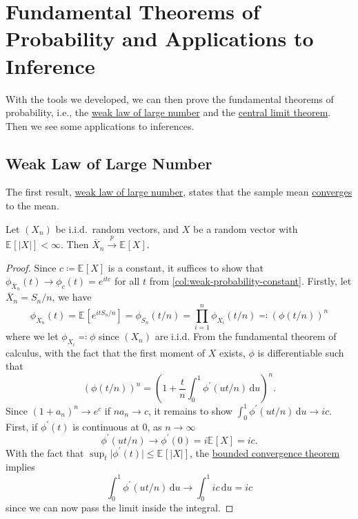 \chapter{Fundamental Theorems of Probability and Applications to Inference}
With the tools we developed, we can then prove the fundamental theorems of probability, i.e., the \hyperref[thm:WLLN]{weak law of large number} and the \hyperref[thm:CLT]{central limit theorem}. Then we see some applications to inferences.
\section{Weak Law of Large Number}
The first result, \hyperref[thm:WLLN]{weak law of large number}, states that the sample mean \hyperref[def:converge-in-probability]{converges} to the mean.

\begin{theorem}\label{thm:WLLN}
	Let \((X_n)\) be i.i.d.\ random vectors, and \(X\) be a random vector with \(\mathbb{E}_{}[\vert X \vert ] < \infty \). Then \(\overline{X} _n \overset{p}{\to } \mathbb{E}_{}[X] \).
\end{theorem}
\begin{proof}
	Since \(c \coloneqq \mathbb{E}_{}[X] \) is a constant, it suffices to show that \(\phi _{\overline{X} _n}(t) \to \phi _{c} (t) = e^{itc}\) for all \(t\) from \autoref{col:weak-probability-constant}. Firstly, let \(\overline{X} _n = S_n / n\), we have
	\[
		\phi _{\overline{X} _n}(t)
		= \mathbb{E}_{}[e^{it S_n / n}]
		= \phi _{S_n}(t / n)
		= \prod_{i=1}^{n} \phi _{X_i}(t / n)
		\eqqcolon \left( \phi (t / n) \right) ^n
	\]
	where we let \(\phi _{X_i} \eqqcolon \phi \) since \((X_n)\) are i.i.d. From the fundamental theorem of calculus, with the fact that the first moment of \(X\) exists, \(\phi \) is differentiable such that
	\[
		\left( \phi (t / n) \right) ^n
		= \left( 1 + \frac{t}{n} \int_{0}^{1} \phi ^{\prime} (u t / n) \,\mathrm{d}u  \right) ^n .
	\]
	Since \((1 + a_n)^n \to e^c\) if \(n a_n \to c\), it remains to show \(\int_{0}^{1} \phi ^{\prime} (u t / n) \,\mathrm{d}u \to ic\). First, if \(\phi ^{\prime} (t)\) is continuous at \(0\), as \(n \to \infty \)
	\[
		\phi ^{\prime} (u t / n) \to \phi ^{\prime} (0) = i \mathbb{E}_{}[X] = ic.
	\]
	With the fact that \(\sup _t \vert \phi ^{\prime} (t) \vert \leq \mathbb{E}_{}[\vert X \vert ] \), the \href{https://en.wikipedia.org/wiki/Dominated_convergence_theorem}{bounded convergence theorem} implies
	\[
		\int_{0}^{1} \phi ^{\prime} (ut / n) \,\mathrm{d}u
		\to \int_{0}^{1} ic \,\mathrm{d}u
		= ic
	\]
	since we can now pass the limit inside the integral.
\end{proof}

